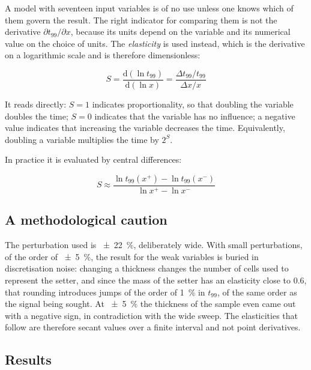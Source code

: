 \documentclass[11pt,a4paper]{article}
\begin{document}
A model with seventeen input variables is of no use unless one knows which
of them govern the result. The right indicator for comparing them is not
the derivative $\partial t_{99}/\partial x$, because its units depend on the
variable and its numerical value on the choice of units. The
\emph{elasticity} is used instead, which is the derivative on a logarithmic
scale and is therefore dimensionless:

\begin{equation}
\boxed{\;
S = \frac{\mathrm{d}\left( \ln t_{99} \right)}
         {\mathrm{d}\left( \ln x \right)}
= \frac{\Delta t_{99} / t_{99}}{\Delta x / x}
\;}
\end{equation}

It reads directly: $S = 1$ indicates proportionality, so that doubling the
variable doubles the time; $S = 0$ indicates that the variable has no
influence; a negative value indicates that increasing the variable
decreases the time. Equivalently, doubling a variable multiplies the time
by $2^{S}$.

In practice it is evaluated by central differences:

\begin{equation}
S \approx \frac{\ln t_{99}(x^{+}) - \ln t_{99}(x^{-})}
               {\ln x^{+} - \ln x^{-}}
\end{equation}

\subsection{A methodological caution}

The perturbation used is \SI{\pm 22}{\percent}, deliberately wide. With
small perturbations, of the order of \SI{\pm 5}{\percent}, the result for
the weak variables is buried in discretisation noise: changing a thickness
changes the number of cells used to represent the setter, and since the
mass of the setter has an elasticity close to \num{0.6}, that rounding
introduces jumps of the order of \SI{1}{\percent} in $t_{99}$, of the same
order as the signal being sought. At \SI{\pm 5}{\percent} the thickness of
the sample even came out with a negative sign, in contradiction with the
wide sweep. The elasticities that follow are therefore secant values over a
finite interval and not point derivatives.

\subsection{Results}
\end{document}
